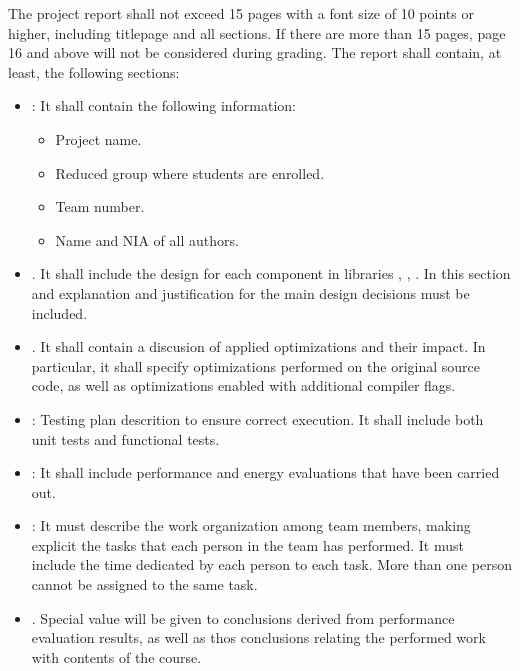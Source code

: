 The project report shall not exceed 15 pages with a font size of 10 points
or higher, including titlepage and all sections. If there are more than
15 pages, page 16 and above will not be considered during grading.
The report shall contain, at least, the following sections:

\begin{itemize}

\item {}: It shall contain the following information:
  \begin{itemize}
    \item Project name.
    \item Reduced group where students are enrolled.
    \item Team number.
    \item Name and NIA of all authors.
  \end{itemize}

\item {}. 
      It shall include the design for each component in libraries
      , , .
      In this section and explanation and justification for the main
      design decisions must be included.

\item {}. 
      It shall contain a discusion of applied optimizations and their
      impact. In particular, it shall specify optimizations performed
      on the original source code, as well as optimizations enabled
      with additional compiler flags.

\item {}: 
      Testing plan descrition to ensure correct execution.
      It shall include both unit tests and functional tests.

\item {}:
      It shall include performance and energy evaluations that have been
      carried out.

\item {}:
      It must describe the work organization among team members, 
      making explicit the tasks that each person in the team has performed.
      It must include the time dedicated by each person to each task.
      More than one person cannot be assigned to the same task.

\item {}.
      Special value will be given to conclusions derived from performance evaluation
      results, as well as thos conclusions relating the performed work with
      contents of the course.

\end{itemize}
